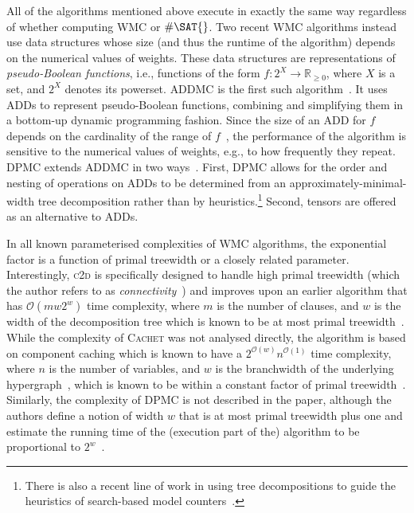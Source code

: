 \documentclass[runningheads]{llncs}
\begin{document}
All of the algorithms mentioned above execute in exactly the same way regardless
of whether computing \textsf{WMC} or $\#\SAT{}$. Two recent \textsf{WMC}
algorithms instead use data structures whose size (and thus the runtime of the
algorithm) depends on the numerical values of weights. These data structures are
representations of \emph{pseudo-Boolean functions}, i.e., functions of the form
$f\colon 2^X \to \mathbb{R}_{\ge 0}$, where $X$ is a set, and $2^X$ denotes its
powerset. \textsc{ADDMC} is the first such
algorithm~\cite{DBLP:conf/aaai/DudekPV20}. It uses ADDs to represent
pseudo-Boolean functions, combining and simplifying them in a bottom-up dynamic
programming fashion. Since the size of an ADD for $f$ depends on the cardinality
of the range of $f$~\cite{DBLP:journals/fmsd/BaharFGHMPS97}, the performance of
the algorithm is sensitive to the numerical values of weights, e.g., to how
frequently they repeat. \textsc{DPMC} extends \textsc{ADDMC} in two
ways~\cite{DBLP:conf/cp/DudekPV20}. First, \textsc{DPMC} allows for the order
and nesting of operations on ADDs to be determined from an
approximately-minimal-width tree decomposition rather than by
heuristics.\footnote{There is also a recent line of work in using tree
  decompositions to guide the heuristics of search-based model
  counters~\cite{DBLP:conf/cp/KorhonenJ21}.} Second, tensors are offered as an
alternative to ADDs.

In all known parameterised complexities of \textsf{WMC} algorithms, the
exponential factor is a function of primal treewidth or a closely related
parameter. Interestingly, \textsc{c2d} is specifically designed to handle high
primal treewidth (which the author refers to as
\emph{connectivity}~\cite{DBLP:conf/ijcai/Darwiche99}) and improves upon an
earlier algorithm that has $\mathcal{O}(mw2^w)$ time complexity, where $m$ is
the number of clauses, and $w$ is the width of the decomposition tree which is
known to be at most primal
treewidth~\cite{DBLP:journals/jacm/Darwiche01,DBLP:conf/ecai/Darwiche04}. While
the complexity of \textsc{Cachet} was not analysed directly, the algorithm is
based on component caching which is known to have a
$2^{\mathcal{O}(w)}n^{\mathcal{O}(1)}$ time complexity, where $n$ is the number
of variables, and $w$ is the branchwidth of the underlying
hypergraph~\cite{DBLP:journals/jair/BacchusDP09,DBLP:conf/sat/SangBBKP04}, which
is known to be within a constant factor of primal
treewidth~\cite{DBLP:journals/jct/RobertsonS91}. Similarly, the complexity of
\textsf{DPMC} is not described in the paper, although the authors define a
notion of width $w$ that is at most primal treewidth plus one and estimate the
running time of the (execution part of the) algorithm to be proportional to
$2^w$~\cite{DBLP:conf/cp/DudekPV20}.
\end{document}
